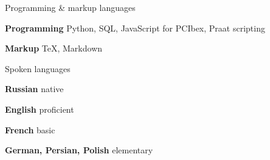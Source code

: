 

\begin{cventries}

   \cventry
    {Programming \& markup languages} %
    {} %
    {} %
    {} %
    {
      \begin{cvitems} %
        \item {\textbf{Programming} Python, SQL, JavaScript for PCIbex, Praat scripting}
        \item {\textbf{Markup} TeX, Markdown}
      \end{cvitems}
    }

 \cventry
    {Spoken languages} %
    {} %
    {} %
    {} %
    {
      \begin{cvitems} %
        \item {\textbf{Russian} native}
        \item {\textbf{English} proficient}
        \item {\textbf{French} basic}
        \item {\textbf{German, Persian, Polish} elementary}
      \end{cvitems}
    }

\end{cventries}
